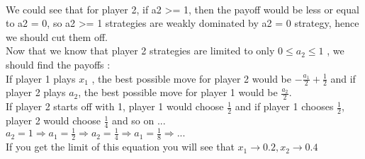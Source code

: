 \\
\begin{latin}
    \noindent
    We could see that for player 2, if a2 >= 1, then the payoff would be 
    less or equal to a2 = 0, so a2 >= 1 strategies are weakly dominated by a2 = 0 strategy, hence we should cut them off. \\
    Now that we know that player 2 strategies are limited to only $0 \leq a_2 \leq 1$ , we should find the payoffs : \\ 
    If player 1 plays $x_1$ , the best possible move for player 2 would be $-\frac{a_1}{2} + \frac{1}{2}$ and if player 2 plays $a_2$,
    the best possible move for player 1 would be $\frac{a_2}{2}$. \\ 
    If player 2 starts off with 1, player 1 would choose $\frac{1}{2}$ and if player 1 chooses $\frac{1}{2}$, player 2 would choose $\frac{1}{4}$ and so on ... \\
    $a_2 = 1 \Rightarrow a_1 = \frac{1}{2} \Rightarrow a_2 = \frac{1}{4} \Rightarrow a_1 = \frac{1}{8} \Rightarrow ...$ \\ 
    If you get the limit of this equation you will see that $x_1 \rightarrow 0.2 , x_2 \rightarrow 0.4$ 
\end{latin}

